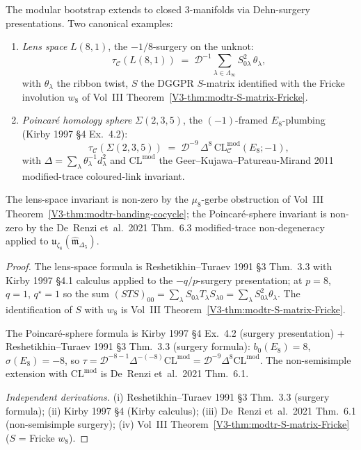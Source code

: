 \begin{theorem}
\label{thm:modbootstrap-lens-poincare-dehn}
\ClaimStatusConditional
The modular bootstrap extends to closed 3-manifolds via
Dehn-surgery presentations. Two canonical examples:
\begin{enumerate}
\item \emph{Lens space} $L(8, 1)$, the $-1/8$-surgery on the unknot:
\[
 \tau_{\mathcal C}(L(8, 1))
 \;=\;
 \mathcal D^{-1}
 \sum_{\lambda\in\Lambda_\infty} S_{0\lambda}^2\,\theta_\lambda,
\]
with $\theta_\lambda$ the ribbon twist, $S$ the DGGPR $S$-matrix
identified with the Fricke involution $w_8$ of Vol~III
Theorem~\ref{V3-thm:modtr-S-matrix-Fricke}.

\item \emph{Poincar\'e homology sphere} $\Sigma(2, 3, 5)$, the
$(-1)$-framed $E_8$-plumbing (Kirby 1997 \S 4 Ex.~4.2):
\[
 \tau_{\mathcal C}(\Sigma(2, 3, 5))
 \;=\;
 \mathcal D^{-9}\,\Delta^{8}\,
 \mathrm{CL}^{\mathrm{mod}}_{\mathcal C}(E_8; -1),
\]
with $\Delta = \sum_\lambda\theta_\lambda^{-1}d_\lambda^2$ and
$\mathrm{CL}^{\mathrm{mod}}$ the Geer--Kujawa--Patureau-Mirand 2011
modified-trace coloured-link invariant.
\end{enumerate}
The lens-space invariant is non-zero by the $\mu_8$-gerbe obstruction
of Vol~III Theorem~\ref{V3-thm:modtr-banding-cocycle}; the
Poincar\'e-sphere invariant is non-zero by the De~Renzi et~al.\ 2021
Thm.~6.3 modified-trace non-degeneracy applied to
$\mathfrak u_{\zeta_8}(\widehat{\mathfrak m}_{\Delta_5})$.
\end{theorem}

\begin{proof}
The lens-space formula is Reshetikhin--Turaev 1991 \S 3 Thm.~3.3 with
Kirby 1997 \S 4.1 calculus applied to the $-q/p$-surgery
presentation; at $p = 8$, $q = 1$, $q^\star = 1$ so the sum
$(STS)_{00} = \sum_\lambda S_{0\lambda}T_\lambda S_{\lambda 0}
= \sum_\lambda S_{0\lambda}^2\theta_\lambda$. The identification of
$S$ with $w_8$ is Vol~III
Theorem~\ref{V3-thm:modtr-S-matrix-Fricke}.

The Poincar\'e-sphere formula is Kirby 1997 \S 4 Ex.~4.2 (surgery
presentation) + Reshetikhin--Turaev 1991 \S 3 Thm.~3.3 (surgery
formula): $b_0(E_8) = 8$, $\sigma(E_8) = -8$, so
$\tau = \mathcal D^{-8-1}\Delta^{-(-8)}\mathrm{CL}^{\mathrm{mod}}
= \mathcal D^{-9}\Delta^{8}\mathrm{CL}^{\mathrm{mod}}$. The
non-semisimple extension with $\mathrm{CL}^{\mathrm{mod}}$ is
De~Renzi et~al.\ 2021 Thm.~6.1.

\emph{Independent derivations.}
(i) Reshetikhin--Turaev 1991 \S 3 Thm.~3.3 (surgery formula);
(ii) Kirby 1997 \S 4 (Kirby calculus);
(iii) De~Renzi et~al.\ 2021 Thm.~6.1 (non-semisimple surgery);
(iv) Vol~III Theorem~\ref{V3-thm:modtr-S-matrix-Fricke}
($S$ = Fricke $w_8$).
\end{proof}

